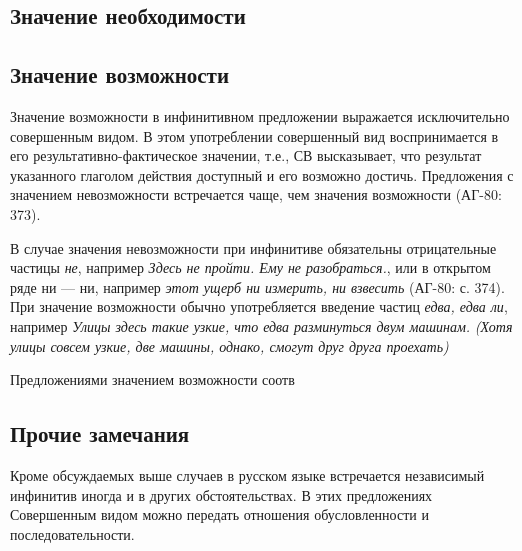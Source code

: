 \subsection{Значение необходимости}


\subsection{Значение возможности}

Значение возможности в инфинитивном предложении выражается исключительно совершенным видом. В этом употреблении совершенный вид воспринимается в его результативно-фактическое значении, т.е., СВ высказывает, что результат указанного глаголом действия доступный и его возможно достичь. Предложения с значением невозможности встречается чаще, чем значения возможности (АГ-80: 373). 

В случае значения невозможности при инфинитиве обязательны отрицательные частицы \textit{не}, например \textit{Здесь не пройти. Ему не разобраться.}, или в открытом ряде ни --- ни, например \textit{этот ущерб ни измерить, ни взвесить} (АГ-80: с. 374). При значение возможности обычно употребляется введение частиц \textit{едва, едва ли}, например \textit{Улицы здесь такие узкие, что едва разминуться двум машинам.} \textit{(Хотя улицы совсем узкие, две машины, однако, смогут друг друга проехать)}

Предложениями значением возможности соотв

\subsection{Прочие замечания}

Кроме обсуждаемых выше случаев в русском языке встречается независимый инфинитив иногда и в других обстоятельствах. В этих предложениях Совершенным видом можно передать отношения обусловленности и последовательности. 
